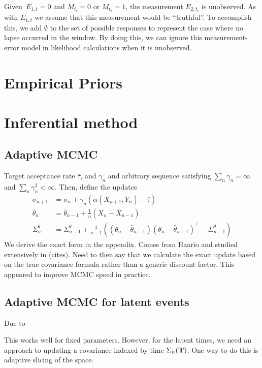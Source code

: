 \documentclass[11pt]{amsart}
\begin{document}
Given~$E_{1,t} = 0$ and $M_{t_i} = 0$ or $M_{t_i} = 1$, the
measurement $E_{2,t_i}$ is unobserved.  As with $E_{1,t}$ we assume
that this measurement would be ``truthful''.  To accomplish this, we
add $\emptyset$ to the set of possible responses to represent the case
where no lapse occurred in the window.
By doing this, we can ignore this measurement-error model in
likelihood calculations when it is unobserved.

\section{Empirical Priors}

\section{Inferential method}

\subsection{Adaptive MCMC}

Target acceptance rate $\bar \tau$, and $\gamma_n$ and arbitrary sequence satisfying $\sum_n \gamma_n = \infty$ and $\sum_n \gamma_n^2 < \infty$.  Then, define the updates
$$
\begin{aligned}
\sigma_{n+1} &= \sigma_n + \gamma_n \left( \alpha(X_{n+1}, Y_n) - \bar \tau \right) \\
\bar \theta_n &= \bar \theta_{n-1} + \frac{1}{n} \left( X_n - \bar X_{n-1} \right) \\
\Sigma_n^\theta &= \Sigma_{n-1}^{\theta}  + \frac{1}{n-1} \left( (\theta_n - \bar \theta_{n-1}) (\theta_n - \bar \theta_{n-1})^\top - \Sigma_{n-1}^\theta \right)
\end{aligned}
$$
We derive the exact form in the appendix.  Comes from Haario and studied extensively in (cites).  Need to then say that we calculate the exact update based on the true covariance formula rather than a generic discount factor.  This appeared to improve MCMC speed in practice.

\subsection{Adaptive MCMC for latent events}

Due to

This works well for fixed parameters.  However, for the latent times, we need an approach to updating a covariance indexed by time $\Sigma_{n} (\bf T)$.  One way to do this is adaptive slicing of the space.
\end{document}
